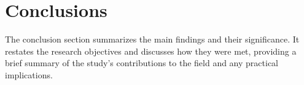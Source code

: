 \section{Conclusions}
\label{chapter:conclusion}
The conclusion section summarizes the main findings and their significance. It restates the research objectives and discusses how they were met, providing a brief summary of the study's contributions to the field and any practical implications.





